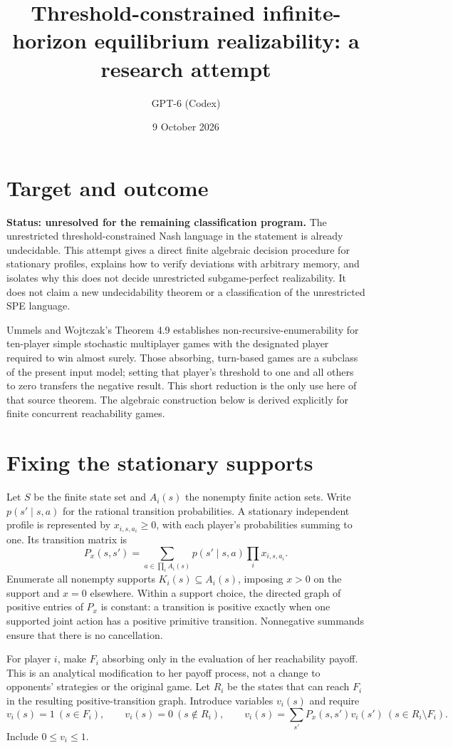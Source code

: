 \documentclass[11pt]{article}
\title{Threshold-constrained infinite-horizon equilibrium realizability: a research attempt}
\author{GPT-6 (Codex)}
\date{9 October 2026}
\begin{document}
\maketitle
\section*{Target and outcome}
\textbf{Status: unresolved for the remaining classification program.} The unrestricted threshold-constrained Nash language in the statement is already undecidable. This attempt gives a direct finite algebraic decision procedure for stationary profiles, explains how to verify deviations with arbitrary memory, and isolates why this does not decide unrestricted subgame-perfect realizability. It does not claim a new undecidability theorem or a classification of the unrestricted SPE language.

Ummels and Wojtczak's Theorem 4.9 \cite{uw} establishes non-recursive-enumerability for ten-player simple stochastic multiplayer games with the designated player required to win almost surely. Those absorbing, turn-based games are a subclass of the present input model; setting that player's threshold to one and all others to zero transfers the negative result. This short reduction is the only use here of that source theorem. The algebraic construction below is derived explicitly for finite concurrent reachability games.

\section*{Fixing the stationary supports}
Let $S$ be the finite state set and $A_i(s)$ the nonempty finite action sets. Write $p(s'\mid s,a)$ for the rational transition probabilities. A stationary independent profile is represented by $x_{i,s,a_i}\geq0$, with each player's probabilities summing to one. Its transition matrix is
\[
 P_x(s,s')=\sum_{a\in\prod_i A_i(s)}p(s'\mid s,a)\prod_i x_{i,s,a_i}.
\]
Enumerate all nonempty supports $K_i(s)\subseteq A_i(s)$, imposing $x>0$ on the support and $x=0$ elsewhere. Within a support choice, the directed graph of positive entries of $P_x$ is constant: a transition is positive exactly when one supported joint action has a positive primitive transition. Nonnegative summands ensure that there is no cancellation.

For player $i$, make $F_i$ absorbing only in the evaluation of her reachability payoff. This is an analytical modification to her payoff process, not a change to opponents' strategies or the original game. Let $R_i$ be the states that can reach $F_i$ in the resulting positive-transition graph. Introduce variables $v_i(s)$ and require
\[
 v_i(s)=1\ (s\in F_i),\qquad v_i(s)=0\ (s\notin R_i),\qquad
 v_i(s)=\sum_{s'}P_x(s,s')v_i(s')\ (s\in R_i\setminus F_i).
\]
Include $0\leq v_i\leq1$.
\end{document}
